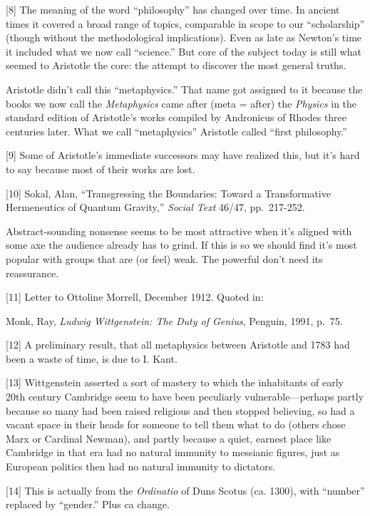 {[}8{]} The meaning of the word ``philosophy'' has changed over time. In
ancient times it covered a broad range of topics, comparable in scope to
our ``scholarship'' (though without the methodological implications).
Even as late as Newton's time it included what we now call ``science.''
But core of the subject today is still what seemed to Aristotle the
core: the attempt to discover the most general truths.

Aristotle didn't call this ``metaphysics.'' That name got assigned to it
because the books we now call the \emph{Metaphysics} came after (meta =
after) the \emph{Physics} in the standard edition of Aristotle's works
compiled by Andronicus of Rhodes three centuries later. What we call
``metaphysics'' Aristotle called ``first philosophy.''

{[}9{]} Some of Aristotle's immediate successors may have realized this,
but it's hard to say because most of their works are lost.

{[}10{]} Sokal, Alan, ``Transgressing the Boundaries: Toward a
Transformative Hermeneutics of Quantum Gravity,'' \emph{Social Text}
46/47, pp.~217-252.

Abstract-sounding nonsense seems to be most attractive when it's aligned
with some axe the audience already has to grind. If this is so we should
find it's most popular with groups that are (or feel) weak. The powerful
don't need its reassurance.

{[}11{]} Letter to Ottoline Morrell, December 1912. Quoted in:

Monk, Ray, \emph{Ludwig Wittgenstein: The Duty of Genius}, Penguin,
1991, p.~75.

{[}12{]} A preliminary result, that all metaphysics between Aristotle
and 1783 had been a waste of time, is due to I. Kant.

{[}13{]} Wittgenstein asserted a sort of mastery to which the
inhabitants of early 20th century Cambridge seem to have been peculiarly
vulnerable---perhaps partly because so many had been raised religious
and then stopped believing, so had a vacant space in their heads for
someone to tell them what to do (others chose Marx or Cardinal Newman),
and partly because a quiet, earnest place like Cambridge in that era had
no natural immunity to messianic figures, just as European politics then
had no natural immunity to dictators.

{[}14{]} This is actually from the \emph{Ordinatio} of Duns Scotus (ca.
1300), with ``number'' replaced by ``gender.'' Plus ca change.

